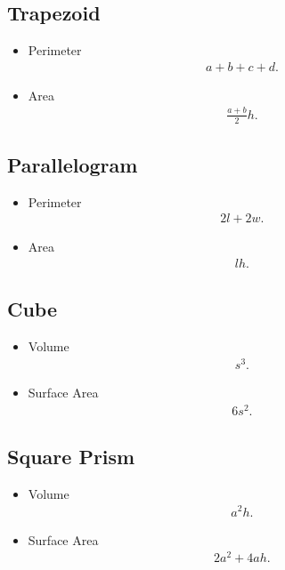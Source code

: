 \documentclass{report}
\begin{document}
    \bigbreak \noindent \bigbreak \noindent 
    \subsection{Trapezoid}
    \begin{itemize}
      \item Perimeter
        \begin{align*}
          a + b + c + d 
        .\end{align*}
      \item Area
        \begin{align*}
         \frac{a+b}{2}h 
        .\end{align*}
    \end{itemize}

    \bigbreak \noindent \bigbreak \noindent 
    \subsection{Parallelogram}
    \begin{itemize}
      \item Perimeter
        \begin{align*}
          2l + 2w
        .\end{align*}
      \item Area
        \begin{align*}
          lh
        .\end{align*}
    \end{itemize}

    \bigbreak \noindent \bigbreak \noindent 
    \subsection{Cube}
    \begin{itemize}
      \item Volume
        \begin{align*}
          s^{3}
        .\end{align*}
      \item Surface Area
        \begin{align*}
          6s^{2}
        .\end{align*}
    \end{itemize}

    \bigbreak \noindent \bigbreak \noindent 
    \subsection{Square Prism}
    \begin{itemize}
      \item Volume
        \begin{align*}
          a^{2}h
        .\end{align*}
      \item Surface Area
        \begin{align*}
          2a^{2}+4ah
        .\end{align*}
    \end{itemize}
\end{document}
